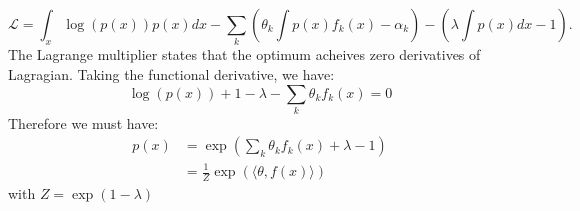\documentclass{article}
\begin{document}
\begin{enumerate}
\begin{equation}
\mathcal{L} = \int_x \log(p(x)) p(x) dx - \sum_{k} (\theta_k \int p(x) f_k(x)  - \alpha_k) - (\lambda \int p(x)dx -1).
\end{equation}
The Lagrange multiplier states that the optimum acheives zero derivatives of Lagragian. Taking the functional derivative, we have:
\begin{equation}
\log (p(x) ) + 1 - \lambda - \sum_{k} \theta_k f_k(x) = 0
\end{equation}
Therefore we must have:
\begin{align}
p(x) &= \exp (\sum_{k} \theta_k f_k(x) + \lambda - 1)\\
&=\frac{1}{Z} \exp (\langle \theta, f(x) \rangle)
\end{align}
with $Z = \exp(1-\lambda)$
\end{enumerate}

%
%
\end{document}
